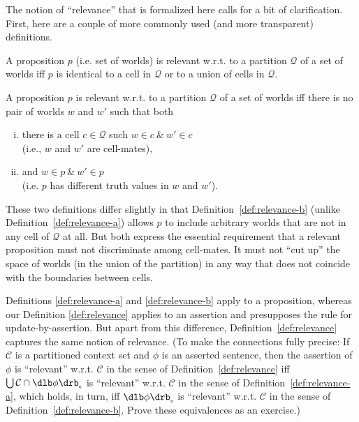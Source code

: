 The notion of ``relevance'' that is formalized here calls for a bit of
clarification. First, here are a couple of more commonly used (and more
transparent) definitions.

\begin{definition*}[Relevance$'$]\label{def:relevance-a}
  A proposition $p$ (i.e. set of worlds) is relevant w.r.t. to a partition
  $\mathcal{Q}$ of a set of worlds iff $p$ is identical to a cell in
  $\mathcal{Q}$ or to a union of cells in $\mathcal{Q}$.
\end{definition*}

\begin{definition*}[Relevance$''$]\label{def:relevance-b}
  A proposition $p$ is relevant w.r.t. to a partition $\mathcal{Q}$ of a set of
  worlds iff there is no pair of worlds $w$ and $w'$ such that both

  \begin{enumerate}[(i)]
    \item there is a cell $c \in \mathcal{Q}$ such $w \in c\ \&\ w' \in c$\\
    (i.e., $w$ and $w'$ are cell-mates),
    \item and $w \in p\ \&\ w' \in p$\\
    (i.e. $p$ has different truth values in $w$ and $w'$).
  \end{enumerate}
\end{definition*}

These two definitions differ slightly in that Definition~\ref{def:relevance-b}
(unlike Definition~\ref{def:relevance-a}) allows $p$ to include arbitrary worlds
that are not in any cell of $\mathcal{Q}$ at all. But both express the essential
requirement that a relevant proposition must not discriminate among cell-mates.
It must not ``cut up'' the space of worlds (in the union of the partition) in
any way that does not coincide with the boundaries between cells.

Definitions \ref{def:relevance-a} and \ref{def:relevance-b} apply to a
proposition, whereas our Definition \ref{def:relevance} applies to an assertion
and presupposes the rule for update-by-assertion. But apart from this
difference, Definition~\ref{def:relevance} captures the same notion of
relevance. (To make the connections fully precise: If $\mathcal{C}$ is a
partitioned context set and $\phi$ is an asserted sentence, then the assertion
of $\phi$ is ``relevant'' w.r.t. $\mathcal{C}$ in the sense of
Definition~\ref{def:relevance} iff $\bigcup \mathcal{C} \cap \svcent{\phi}$ is
``relevant'' w.r.t. $\mathcal{C}$ in the sense of
Definition~\ref{def:relevance-a}, which holds, in turn, iff $\svcent{\phi}$ is
``relevant'' w.r.t. $\mathcal{C}$ in the sense of
Definition~\ref{def:relevance-b}. Prove these equivalences as an exercise.)

